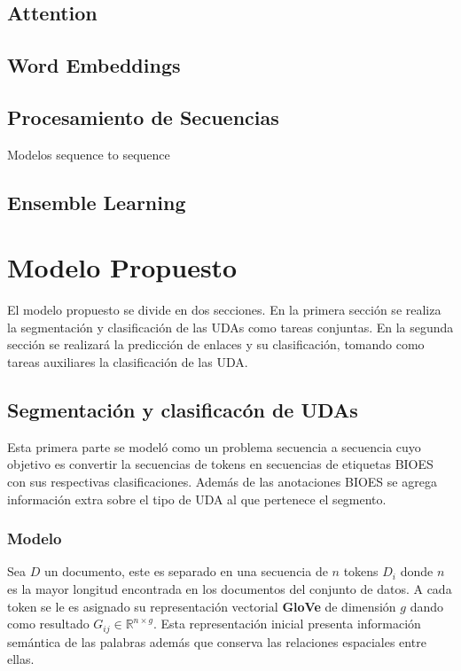 \subsection{Attention}

\subsection{Word Embeddings}

\subsection{Procesamiento de Secuencias}

Modelos sequence to sequence

\subsection{Ensemble Learning}

\section{Modelo Propuesto}

El modelo propuesto se divide en dos secciones. En la primera sección se realiza la segmentación y clasificación de 
las UDAs como tareas conjuntas. En la segunda sección se realizará la predicción de enlaces y su clasificación, tomando
como tareas auxiliares la clasificación de las UDA.

\subsection{Segmentación y clasificacón de UDAs}

Esta primera parte se modeló como un problema secuencia a secuencia cuyo objetivo es convertir la secuencias de 
tokens en secuencias de etiquetas BIOES con sus respectivas clasificaciones. Además de las 
anotaciones BIOES se agrega información extra sobre el tipo de UDA al que pertenece el segmento.

\subsubsection{Modelo}

Sea $D$ un documento, este es separado en una secuencia de $n$ tokens $D_i$ donde $n$ es la mayor longitud encontrada
en los documentos del conjunto de datos. A cada token se le es asignado
su representación vectorial \textbf{GloVe} de dimensión $g$ dando como resultado $G_{ij} \in \mathbb{R}^{n \times g}$.
Esta representación inicial presenta información semántica de las palabras además que conserva las relaciones 
espaciales entre ellas. 

